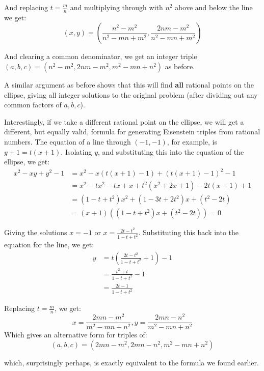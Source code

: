 \documentclass{article}
\begin{document}
And replacing $t = \frac{m}{n}$ and multiplying through with $n^2$ above and below the line we get:
\[(x,y) = \left(\frac{n^2-m^2}{n^2-mn+m^2}, \frac{2nm - m^2}{n^2-mn+ m^2}\right) \]

And clearing a common denominator, we get an integer triple
$(a,b,c) = (n^2 - m^2, 2nm - m^2, m^2 - mn + n^2)$ as before.

A similar argument as before shows that this will find \textbf{all} rational points on the
ellipse, giving all integer solutions to the original problem (after dividing out any common factors
of $a, b, c$).

Interestingly, if we take a different rational point on the ellipse, we will get a different, but
equally valid, formula for generating Eisenstein triples from rational numbers. The equation of
a line through $(-1,-1)$, for example, is $y + 1 = t(x + 1)$. Isolating $y$, and substituting this
into the equation of the ellipse, we get:
\begin{equation*}
        \begin{split}
		x^2 - xy + y^2 - 1 & = x^2 - x(t(x+1)-1) + (t(x+1)-1)^2 - 1\\
		& = x^2 -tx^2 -tx + x + t^2(x^2+2x+1)-2t(x+1)+1 \\
		& = (1 - t + t^2)x^2 + (1 - 3t + 2t^2)x + (t^2-2t) \\
		& = (x+1)((1 - t + t^2)x + (t^2-2t)) = 0
	\end{split}
\end{equation*}

Giving the solutions $x = -1$ or $x = \frac{2t-t^2}{1-t+t^2}$.
Substituting this back into the equation for the line, we get:
\begin{equation*} 
        \begin{split}
		y &= t\left(\frac{2t-t^2}{1-t+t^2} + 1\right) - 1 \\
		& = \frac{t^2 + t}{1-t+t^2} - 1 \\
		& = \frac{2t - 1}{1 - t + t^2}
	\end{split}
\end{equation*}

Replacing $t = \frac{m}{n}$, we get:
\[ x = \frac{2mn - m^2}{m^2 - mn + n^2}, y = \frac{2mn - n^2}{m^2 - mn + n^2} \]
Which gives an alternative form for triples of:
\[ (a,b,c) = (2mn - m^2, 2mn - n^2, m^2 -mn + n^2) \]

which, surprisingly perhaps, is exactly equivalent to the formula we found earlier.
\end{document}
